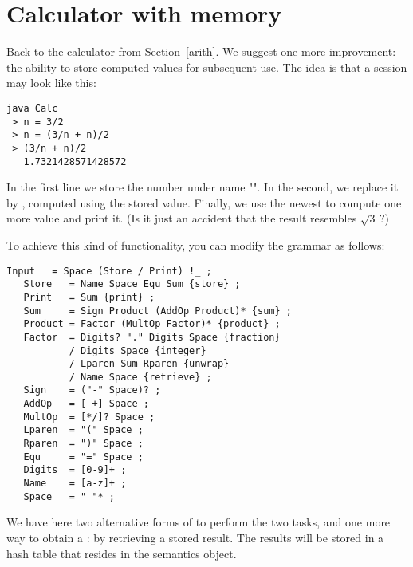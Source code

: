 \newpage

\section{Calculator with memory\label{calc}}


Back to the calculator from Section~\ref{arith}.
We suggest one more improvement:
the ability to store computed values for subsequent use.
The idea is that  
a session may look like this:

\small
\begin{Verbatim}[samepage=true,xleftmargin=15mm,baselinestretch=0.8]
 java Calc
 > n = 3/2
 > n = (3/n + n)/2
 > (3/n + n)/2
   1.7321428571428572
\end{Verbatim}
\normalsize

In the first line we store the number  under name "".
In the second, we replace it by , computed using the stored value.
Finally, we use the newest  to compute one more value and print it.
(Is it just an accident that the result resembles $\sqrt{3}$\,?)

To achieve this kind of functionality, you can modify the grammar as follows:

\small
\begin{Verbatim}[frame=single,framesep=2mm,samepage=true,xleftmargin=15mm,xrightmargin=15mm,baselinestretch=0.8]
   Input   = Space (Store / Print) !_ ;
   Store   = Name Space Equ Sum {store} ;
   Print   = Sum {print} ;
   Sum     = Sign Product (AddOp Product)* {sum} ;
   Product = Factor (MultOp Factor)* {product} ;
   Factor  = Digits? "." Digits Space {fraction}
           / Digits Space {integer}
           / Lparen Sum Rparen {unwrap} 
           / Name Space {retrieve} ; 
   Sign    = ("-" Space)? ;
   AddOp   = [-+] Space ;
   MultOp  = [*/]? Space ;
   Lparen  = "(" Space ;
   Rparen  = ")" Space ;
   Equ     = "=" Space ;
   Digits  = [0-9]+ ;
   Name    = [a-z]+ ;
   Space   = " "* ;
\end{Verbatim}
\normalsize

We have here two alternative forms of 
to perform the two tasks,
and one more way to obtain a : 
by retrieving a stored result.
The results will be stored in a hash table 
that resides in the semantics object.

